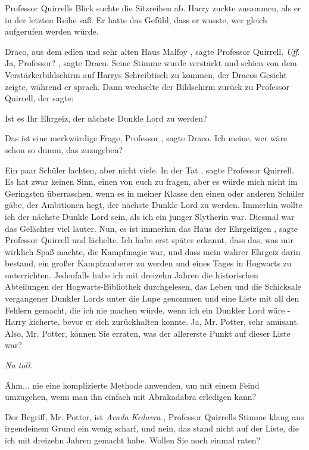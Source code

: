 Professor Quirrells Blick suchte die Sitzreihen ab. Harry zuckte zusammen, als
er in der letzten Reihe saß. Er hatte das Gefühl, dass er wusste, wer gleich
aufgerufen werden würde.

\glqq Draco, aus dem edlen und sehr alten Haus Malfoy\grqq{} , sagte Professor
Quirrell. \emph{Uff}. \glqq Ja, Professor?\grqq{} , sagte Draco. Seine Stimme
wurde verstärkt und schien von dem Verstärkerbildschirm auf Harrys Schreibtisch
zu kommen, der Dracos Gesicht zeigte, während er sprach. Dann wechselte der
Bildschirm zurück zu Professor Quirrell, der sagte:

\glqq Ist es Ihr Ehrgeiz, der nächste Dunkle Lord zu werden?\grqq{}

\glqq Das ist eine merkwürdige Frage, Professor\grqq{} , sagte Draco. \glqq Ich
meine, wer wäre schon so dumm, das zuzugeben?\grqq{}

Ein paar Schüler lachten, aber nicht viele. \glqq In der Tat\grqq{} , sagte
Professor Quirrell. \glqq Es hat zwar keinen Sinn, einen von euch zu fragen,
aber es würde mich nicht im Geringsten überraschen, wenn es in meiner Klasse den
einen oder anderen Schüler gäbe, der Ambitionen hegt, der nächste Dunkle Lord zu
werden. Immerhin wollte ich der nächste Dunkle Lord sein, als ich ein junger
Slytherin war.\grqq{} Diesmal war das Gelächter viel lauter. \glqq Nun, es ist
immerhin das Haus der Ehrgeizigen\grqq{} , sagte Professor Quirrell und
lächelte. \glqq Ich habe erst später erkannt, dass das, was mir wirklich Spaß
machte, die Kampfmagie war, und dass mein wahrer Ehrgeiz darin bestand, ein
großer Kampfzauberer zu werden und eines Tages in Hogwarts zu unterrichten.
Jedenfalls habe ich mit dreizehn Jahren die historischen Abteilungen der
Hogwarts-Bibliothek durchgelesen, das Leben und die Schicksale vergangener
Dunkler Lords unter die Lupe genommen und eine Liste mit all den Fehlern
gemacht, die ich nie machen würde, wenn ich ein Dunkler Lord wäre -\grqq{} Harry
kicherte, bevor er sich zurückhalten konnte. \glqq Ja, Mr. Potter, sehr amüsant.
Also, Mr. Potter, können Sie erraten, was der allererste Punkt auf dieser Liste
war?\grqq{}

\emph{ Na toll.}

\glqq Ähm... nie eine komplizierte Methode anwenden, um mit einem Feind
umzugehen, wenn man ihn einfach mit Abrakadabra erledigen kann?\grqq{}

\glqq Der Begriff, Mr. Potter, ist \emph{Avada Kedavra}\grqq{} , Professor
Quirrells Stimme klang aus irgendeinem Grund ein wenig scharf, \glqq und nein,
das stand nicht auf der Liste, die ich mit dreizehn Jahren gemacht habe. Wollen
Sie noch einmal raten?\grqq{}

